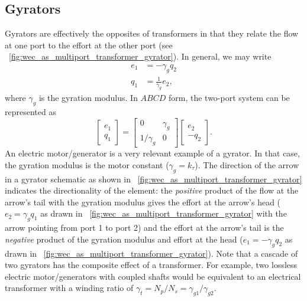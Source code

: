 \documentclass[lettersize,journal]{IEEEtran}
\begin{document}
\subsection{Gyrators}\label{sec:gyrators}
Gyrators are effectively the opposites of transformers in that they relate the flow at one port to the effort at the other port (see \figurename~\ref{fig:wec_as_multiport_transformer_gyrator}).
In general, we may write
%
\begin{subequations}
        \begin{align}
               e_1 &= - \gamma_g q_2 \\
               q_1 &= \frac{1}{\gamma_g} e_2 ,
        \end{align}
        \label{eq:gyrator_eom}%
\end{subequations}
%
where $\gamma_g$ is the gyration modulus.
In $ABCD$ form, the two-port system can be represented as
%
\begin{equation}
        \begin{bmatrix}
                e_1 \\ q_1
        \end{bmatrix}
        =
        \begin{bmatrix}
                0 & \gamma_g \\ 1/\gamma_g & 0
        \end{bmatrix}
        \begin{bmatrix}
                e_2 \\ - q_2
        \end{bmatrix} .
        \label{eq:gyrator_abcd}
\end{equation}
%
An electric motor/generator is a very relevant example of a gyrator.
In that case, the gyration modulus is the motor constant ($\gamma_g=k_\tau$).
The direction of the arrow in a gyrator schematic as shown in \figurename~\ref{fig:wec_as_multiport_transformer_gyrator} indicates the directionality of the element: the \emph{positive} product of the flow at the arrow's tail with the gyration modulus gives the effort at the arrow's head ($e_2 = \gamma_g q_1$ as drawn in \figurename~\ref{fig:wec_as_multiport_transformer_gyrator} with the arrow pointing from port 1 to port 2) and the effort at the arrow's tail is the \emph{negative} product of the gyration modulus and effort at the head ($e_1= - \gamma_g q_2$ as drawn in \figurename~\ref{fig:wec_as_multiport_transformer_gyrator}).
Note that a cascade of two gyrators has the composite effect of a transformer.
For example, two lossless electric motor/generators with coupled shafts would be equivalent to an electrical transformer with a winding ratio of $\gamma_t=N_p/N_s=\gamma_{g1}/\gamma_{g2}$.
\end{document}
